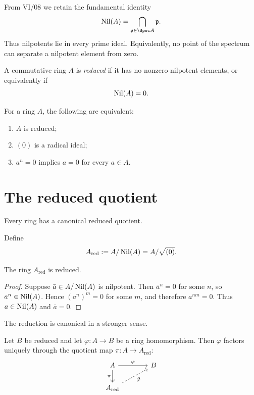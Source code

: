 From VI/08 we retain the fundamental identity
\[
\Nil(A)=\bigcap_{\mathfrak p\in\Spec A}\mathfrak p.
\]
Thus nilpotents lie in every prime ideal.  Equivalently, no point of the spectrum can
separate a nilpotent element from zero.

\begin{definition}
A commutative ring $A$ is \emph{reduced} if it has no nonzero nilpotent elements, or equivalently if
\[
\operatorname{Nil}(A)=0.
\]
\end{definition}

\begin{proposition}
For a ring $A$, the following are equivalent:
\begin{enumerate}
\item $A$ is reduced;
\item $(0)$ is a radical ideal;
\item $a^n=0$ implies $a=0$ for every $a\in A$.
\end{enumerate}
\end{proposition}

\section{The reduced quotient}

Every ring has a canonical reduced quotient.

\begin{definition}
Define
\[
A_{\mathrm{red}}:=A/\operatorname{Nil}(A)=A/\sqrt{(0)}.
\]
\end{definition}

\begin{proposition}
The ring $A_{\mathrm{red}}$ is reduced.
\end{proposition}

\begin{proof}
Suppose $\bar a\in A/\operatorname{Nil}(A)$ is nilpotent.  Then $\bar a^n=0$ for some $n$, so
$a^n\in\operatorname{Nil}(A)$.  Hence $(a^n)^m=0$ for some $m$, and therefore $a^{nm}=0$.  Thus
$a\in\operatorname{Nil}(A)$ and $\bar a=0$.
\end{proof}

The reduction is canonical in a stronger sense.

\begin{theorem}
Let $B$ be reduced and let $\varphi:A\to B$ be a ring homomorphism.  Then $\varphi$ factors
uniquely through the quotient map $\pi:A\to A_{\mathrm{red}}$:
\[
\begin{tikzcd}[column sep=large]
A \arrow[r,"\varphi"] \arrow[d,two heads,"\pi"'] & B\\
A_{\mathrm{red}} \arrow[ur,dashed,"\bar\varphi"'] &
\end{tikzcd}
\]
\end{theorem}

